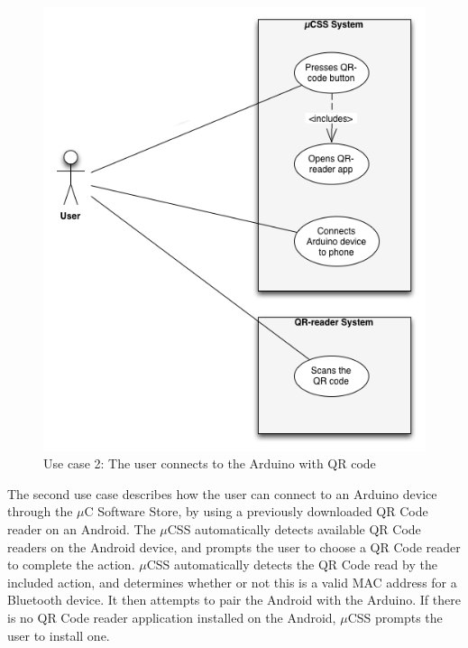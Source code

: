 \begin{figure}[H]
\centering
\includegraphics[scale=0.7]{images/UseCase2}
\caption[Use case 2]{Use case 2: The user connects to the Arduino with QR code}
\end{figure}

The second use case describes how the user can connect to an Arduino device through the $\mu$C Software Store, by using a previously downloaded QR Code reader on an Android. The $\mu$CSS automatically detects available QR Code readers on the Android device, and prompts the user to choose a QR Code reader to complete the action. $\mu$CSS automatically detects the QR Code read by the included action, and determines whether or not this is a valid MAC address for a Bluetooth device. It then attempts to pair the Android with the Arduino. If there is no QR Code reader application installed on the Android, $\mu$CSS prompts the user to install one.

